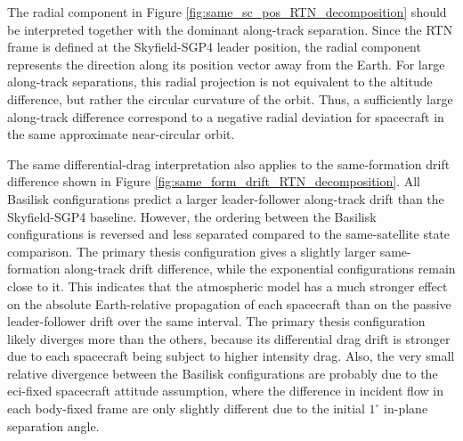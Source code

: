 The radial component in Figure \ref{fig:same_sc_pos_RTN_decomposition} should be interpreted together with the dominant along-track separation. Since the RTN frame is defined at the Skyfield-SGP4 leader position, the radial component represents the direction along its position vector away from the Earth. For large along-track separations, this radial projection is not equivalent to the altitude difference, but rather the circular curvature of the orbit. Thus, a sufficiently large along-track difference correspond to a negative radial deviation for spacecraft in the same approximate near-circular orbit.

The same differential-drag interpretation also applies to the same-formation drift difference shown in Figure \ref{fig:same_form_drift_RTN_decomposition}. All Basilisk configurations predict a larger leader-follower along-track drift than the Skyfield-SGP4 baseline. However, the ordering between the Basilisk configurations is reversed and less separated compared to the same-satellite state comparison. The primary thesis configuration gives a slightly larger same-formation along-track drift difference, while the exponential configurations remain close to it. This indicates that the atmospheric model has a much stronger effect on the absolute Earth-relative propagation of each spacecraft than on the passive leader-follower drift over the same interval. The primary thesis configuration likely diverges more than the others, because its differential drag drift is stronger due to each spacecraft being subject to higher intensity drag. Also, the very small relative divergence between the Basilisk configurations are probably due to the \gls{eci}-fixed spacecraft attitude assumption, where the difference in incident flow in each body-fixed frame are only slightly different due to the initial $1^\circ$ in-plane separation angle. 

